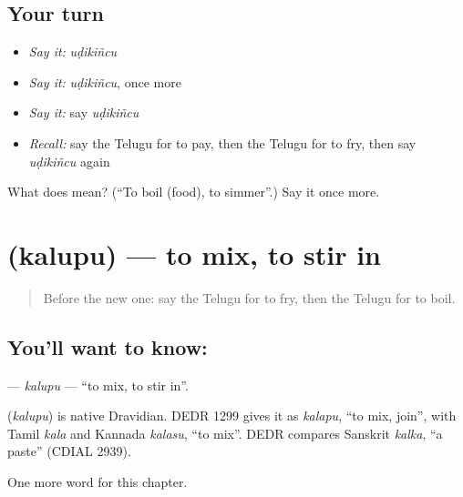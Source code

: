 \subsection*{Your turn}
\begin{itemize}
\raggedright
  \item \emph{Say it:} \emph{uḍikiñcu}
  \item \emph{Say it:} \emph{uḍikiñcu}, once more
  \item \emph{Say it:} say \emph{uḍikiñcu}
  \item \emph{Recall:} say the Telugu for to pay, then the Telugu for to fry, then say \emph{uḍikiñcu} again
\end{itemize}

\begin{tcolorbox}[breakable,colback=teal!4,colframe=teal!35!black,title={Before you move on}]
What does  mean? (\textquotedblleft{}To boil (food), to simmer\textquotedblright{}.) Say it once more.
\end{tcolorbox}
\section[\texorpdfstring{\te{కలుపు} (kalupu)}{కలుపు (kalupu)}]{ (kalupu) — to mix, to stir in}

\label{lesson:TE-C157-kalupu}



\begin{quote}
Before the new one: say the Telugu for to fry, then the Telugu for to boil.
\end{quote}

\subsection*{You'll want to know: }
\textbf{} — \emph{kalupu} — \textquotedblleft{}to mix, to stir in\textquotedblright{}.

\begin{cousinweb}
\textbf{} (\emph{kalupu}) is native Dravidian. DEDR 1299 gives it as \emph{kalapu}, \textquotedblleft{}to mix, join\textquotedblright{}, with Tamil \emph{kala} and Kannada \emph{kalasu}, \textquotedblleft{}to mix\textquotedblright{}. DEDR compares Sanskrit \emph{kalka}, \textquotedblleft{}a paste\textquotedblright{} (CDIAL 2939).
\end{cousinweb}

\begin{grammarlens}[title={What you've built}]
One more word for this chapter.
\end{grammarlens}

